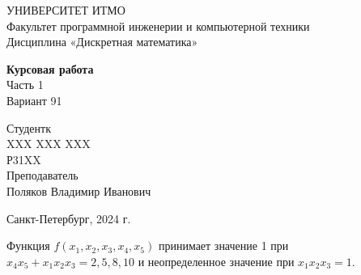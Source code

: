 \documentclass{article}
\begin{document}
\begin{center}
    УНИВЕРСИТЕТ ИТМО \\
    Факультет программной инженерии и компьютерной техники \\
    Дисциплина «Дискретная математика»

    \vspace{5cm}

    \large
    \textbf{Курсовая работа} \\
    Часть 1 \\
    Вариант 91
\end{center}

\vspace{2cm}

\hfill\begin{minipage}{0.35\linewidth}
Студентк \\
XXX XXX XXX \\
Р31XX \\

Преподаватель \\
Поляков Владимир Иванович
\end{minipage}

\vfill

\begin{center}
    Санкт-Петербург, 2024 г.
\end{center}

\thispagestyle{empty}
\newpage

Функция $f(x_1, x_2, x_3, x_4, x_5)$ принимает значение 1 при $x_4 x_5 + x_1 x_2 x_3 = 2, 5, 8, 10$ и неопределенное значение при $x_1 x_2 x_3 = 1$.
\end{document}
